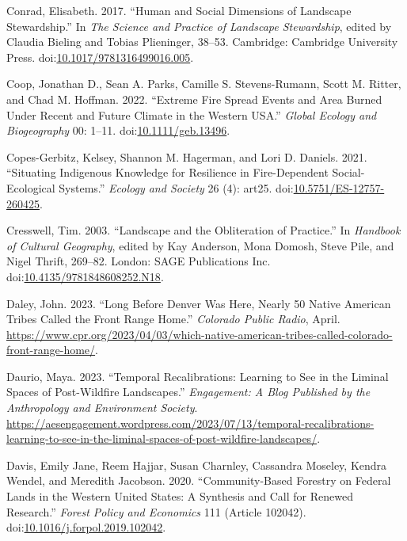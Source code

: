 \documentclass[
]{article}
\newlength{\cslhangindent}
\newenvironment{CSLReferences}[2] %
 {\begin{list}{}{%
  \setlength{\itemindent}{0pt}
  \setlength{\leftmargin}{0pt}
  \setlength{\parsep}{0pt}
  \ifodd #1
   \setlength{\leftmargin}{\cslhangindent}
   \setlength{\itemindent}{-1\cslhangindent}
  \fi
  \setlength{\itemsep}{#2\baselineskip}}}
 {\end{list}}
\begin{document}
\begin{CSLReferences}{1}{0}
Conrad, Elisabeth. 2017. {``Human and {Social Dimensions} of {Landscape Stewardship}.''} In \emph{The {Science} and {Practice} of {Landscape Stewardship}}, edited by Claudia Bieling and Tobias Plieninger, 38--53. Cambridge: Cambridge University Press. doi:\href{https://doi.org/10.1017/9781316499016.005}{10.1017/9781316499016.005}.

Coop, Jonathan D., Sean A. Parks, Camille S. Stevens-Rumann, Scott M. Ritter, and Chad M. Hoffman. 2022. {``Extreme Fire Spread Events and Area Burned Under Recent and Future Climate in the Western {USA}.''} \emph{Global Ecology and Biogeography} 00: 1--11. doi:\href{https://doi.org/10.1111/geb.13496}{10.1111/geb.13496}.

Copes-Gerbitz, Kelsey, Shannon M. Hagerman, and Lori D. Daniels. 2021. {``Situating {Indigenous} Knowledge for Resilience in Fire-Dependent Social-Ecological Systems.''} \emph{Ecology and Society} 26 (4): art25. doi:\href{https://doi.org/10.5751/ES-12757-260425}{10.5751/ES-12757-260425}.

Cresswell, Tim. 2003. {``Landscape and the Obliteration of Practice.''} In \emph{Handbook of {Cultural Geography}}, edited by Kay Anderson, Mona Domosh, Steve Pile, and Nigel Thrift, 269--82. London: SAGE Publications Inc. doi:\href{https://doi.org/10.4135/9781848608252.N18}{10.4135/9781848608252.N18}.

Daley, John. 2023. {``Long Before {Denver} Was Here, Nearly 50 {Native American} Tribes Called the {Front Range} Home.''} \emph{Colorado Public Radio}, April. \url{https://www.cpr.org/2023/04/03/which-native-american-tribes-called-colorado-front-range-home/}.

Daurio, Maya. 2023. {``Temporal {Recalibrations}: {Learning} to {See} in the {Liminal Spaces} of {Post-Wildfire Landscapes}.''} \emph{Engagement: A Blog Published by the Anthropology and Environment Society}. \url{https://aesengagement.wordpress.com/2023/07/13/temporal-recalibrations-learning-to-see-in-the-liminal-spaces-of-post-wildfire-landscapes/}.

Davis, Emily Jane, Reem Hajjar, Susan Charnley, Cassandra Moseley, Kendra Wendel, and Meredith Jacobson. 2020. {``Community-Based Forestry on Federal Lands in the Western {United States}: {A} Synthesis and Call for Renewed Research.''} \emph{Forest Policy and Economics} 111 (Article 102042). doi:\href{https://doi.org/10.1016/j.forpol.2019.102042}{10.1016/j.forpol.2019.102042}.


\end{CSLReferences}
\end{document}
